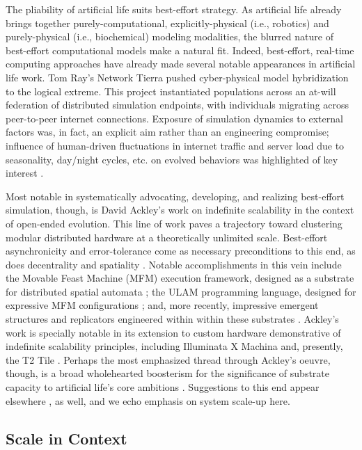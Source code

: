 The pliability of artificial life suits best-effort strategy.
As artificial life already brings together purely-computational, explicitly-physical (i.e., robotics) and purely-physical (i.e., biochemical) modeling modalities, the blurred nature of best-effort computational models make a natural fit.
Indeed, best-effort, real-time computing approaches have already made several notable appearances in artificial life work.
Tom Ray's Network Tierra pushed cyber-physical model hybridization to the logical extreme.
This project instantiated populations across an at-will federation of distributed simulation endpoints, with individuals migrating across peer-to-peer internet connections.
Exposure of simulation dynamics to external factors was, in fact, an explicit aim rather than an engineering compromise;
influence of human-driven fluctuations in internet traffic and server load due to seasonality, day/night cycles, etc. on evolved behaviors was highlighted of key interest \citep{ray1995proposal}.

Most notable in systematically advocating, developing, and realizing best-effort simulation, though, is David Ackley's work on indefinite scalability in the context of open-ended evolution.
This line of work paves a trajectory toward clustering modular distributed hardware at a theoretically unlimited scale.
Best-effort asynchronicity and error-tolerance come as necessary preconditions to this end, as does decentrality and spatiality \citep{ackley2011pursue}.
Notable accomplishments in this vein include the Movable Feast Machine (MFM) execution framework, designed as a substrate for distributed spatial automata \citep{ackley2013movable}; the ULAM programming language, designed for expressive MFM configurations \citep{ackley2016ulam}; and, more recently, impressive emergent structures and replicators engineered within within these substrates \citep{ackley2018digital,ackley2023robust}.
Ackley's work is specially notable in its extension to custom hardware demonstrative of indefinite scalability principles, including Illuminata X Machina \citep{ackley2011homeostatic} and, presently, the T2 Tile \citep{ackley2023robust}.
Perhaps the most emphasized thread through Ackley's oeuvre, though, is a broad wholehearted boosterism for the significance of substrate capacity to artificial life's core ambitions \citep{ackley2014indefinitely}.
Suggestions to this end appear elsewhere \citep{channon2019maximum,banzhaf2016defining,moreno2019toward}, as well, and we echo emphasis on system scale-up here.

\subsection{Scale in Context}

